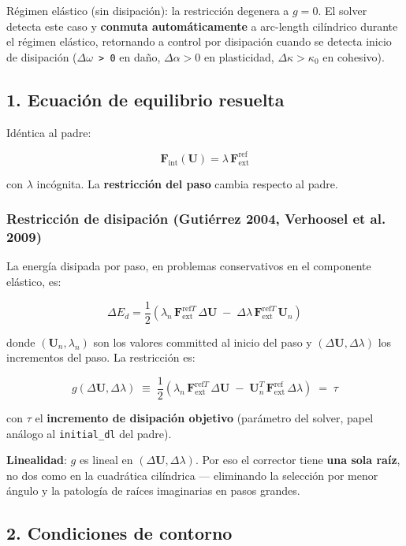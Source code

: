 \documentclass[11pt,letterpaper,oneside]{report}
\begin{document}
Régimen elástico (sin disipación): la restricción degenera a $g = 0$. El solver detecta este caso y \textbf{conmuta automáticamente} a arc-length cilíndrico durante el régimen elástico, retornando a control por disipación cuando se detecta inicio de disipación (\texttt{\ensuremath{\Delta}\ensuremath{\omega} > 0} en daño, $\Delta\alpha > 0$ en plasticidad, $\Delta\kappa > \kappa_0$ en cohesivo).

\subsection{1. Ecuación de equilibrio resuelta}

Idéntica al padre:

\[
\mathbf F_{\text{int}}(\mathbf U) = \lambda\,\mathbf F_{\text{ext}}^{\text{ref}}
\]

con $\lambda$ incógnita. La \textbf{restricción del paso} cambia respecto al padre.

\subsubsection{Restricción de disipación (Gutiérrez 2004, Verhoosel et al. 2009)}

La energía disipada por paso, en problemas conservativos en el componente elástico, es:

\[
\Delta E_d = \frac{1}{2}\left(\lambda_n\,\mathbf F_{\text{ext}}^{\text{ref}T}\,\Delta\mathbf U \;-\; \Delta\lambda\,\mathbf F_{\text{ext}}^{\text{ref}T}\,\mathbf U_n\right)
\]

donde $(\mathbf U_n, \lambda_n)$ son los valores committed al inicio del paso y $(\Delta\mathbf U, \Delta\lambda)$ los incrementos del paso. La restricción es:

\[
g(\Delta\mathbf U, \Delta\lambda) \;\equiv\; \frac{1}{2}\left(\lambda_n\,\mathbf F_{\text{ext}}^{\text{ref}T}\,\Delta\mathbf U \;-\; \mathbf U_n^T\,\mathbf F_{\text{ext}}^{\text{ref}}\,\Delta\lambda\right) \;=\; \tau
\]

con $\tau$ el \textbf{incremento de disipación objetivo} (parámetro del solver, papel análogo al \texttt{initial\_dl} del padre).

\textbf{Linealidad}: $g$ es lineal en $(\Delta\mathbf U, \Delta\lambda)$. Por eso el corrector tiene \textbf{una sola raíz}, no dos como en la cuadrática cilíndrica --- eliminando la selección por menor ángulo y la patología de raíces imaginarias en pasos grandes.

\subsection{2. Condiciones de contorno}
\end{document}
